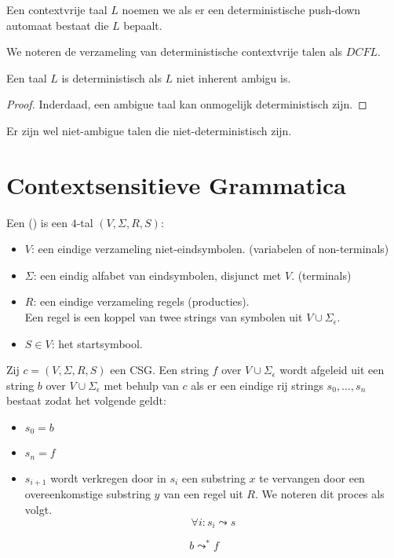 \documentclass[main.tex]{subfiles}
\begin{document}
\begin{de}
  Een contextvrije taal $L$ noemen we  als er een deterministische push-down automaat bestaat die $L$ bepaalt.
\end{de}

\begin{de}
  We noteren de verzameling van deterministische contextvrije talen als $DCFL$.
\end{de}

\begin{st}
  Een taal $L$ is deterministisch als $L$ niet inherent ambigu is.
  \begin{proof}
    Inderdaad, een ambigue taal kan onmogelijk deterministisch zijn.
  \end{proof}
\end{st}

\begin{opm}
  Er zijn wel niet-ambigue talen die niet-deterministisch zijn.
\end{opm}


\section{Contextsensitieve Grammatica}

\begin{de}
  Een  () is een $4$-tal $(V,\Sigma,R,S)$:
  \begin{itemize}
  \item $V$: een eindige verzameling niet-eindsymbolen. (variabelen of non-terminals)
  \item $\Sigma$: een eindig alfabet van eindsymbolen, disjunct met $V$. (terminals)
  \item $R$: een eindige verzameling regels (producties).\\
    Een regel is een koppel van twee strings van symbolen uit $V \cup \Sigma_{\epsilon}$.
  \item $S\in V$: het startsymbool.
  \end{itemize}
\end{de}


\begin{de}
  Zij $c = (V,\Sigma,R,S)$ een CSG.
  Een string $f$ over $V \cup \Sigma_{\epsilon}$ wordt afgeleid uit een string $b$ over $V \cup \Sigma_{\epsilon}$ met behulp van $c$ als er een eindige rij strings $s_{0},\dotsc,s_{n}$ bestaat zodat het volgende geldt:
  \begin{itemize}
  \item $s_{0} = b$
  \item $s_{n} = f$
  \item $s_{i+1}$ wordt verkregen door in $s_{i}$ een substring $x$ te vervangen door een overeenkomstige substring $y$ van een regel uit $R$.
    We noteren dit proces als volgt.
    \[ \forall i: s_{i} \leadsto s \]
  \end{itemize}
  \[ b \leadsto^{*} f \]
\end{de}
\end{document}

